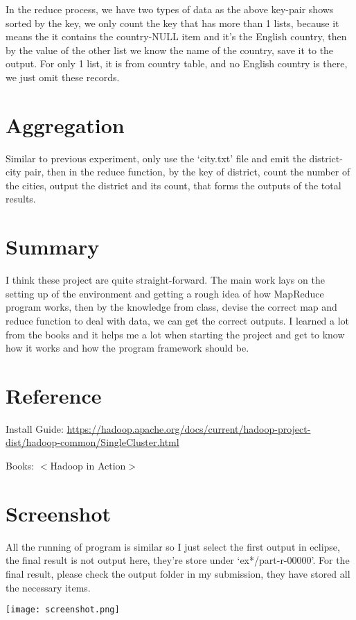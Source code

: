 \documentclass{article}
\begin{document}
In the reduce process, we have two types of data as the above key-pair shows sorted by the key, we only count the key that has more than 1 lists, because it means the it contains the country-NULL item and it's the English country, then by the value of the other list we know the name of the country, save it to the output. For only 1 list, it is from country table, and no English country is there, we just omit these records. 


\section{Aggregation}

Similar to previous experiment, only use the `city.txt' file and emit the district-city pair, then in the reduce function, by the key of district, count the number of the cities, output the district and its count, that forms the outputs of the total results.


\section{Summary}

I think these project are quite straight-forward. The main work lays on the setting up of the environment and getting a rough idea of how MapReduce program works, then by the knowledge from class, devise the correct map and reduce function to deal with data, we can get the correct outputs. I learned a lot from the books and it helps me a lot when starting the project and get to know how it works and how the program framework should be.


\section{Reference}

Install Guide: \url{https://hadoop.apache.org/docs/current/hadoop-project-dist/hadoop-common/SingleCluster.html}

Books: $<$Hadoop in Action$>$

\section{Screenshot}

All the running of program is similar so I just select the first output in eclipse, the final result is not output here, they're store under `ex*/part-r-00000'. For the final result, please check the output folder in my submission, they have stored all the necessary items.

\begin{center}
\texttt{[image: screenshot.png]}
\end{center}
\end{document}
